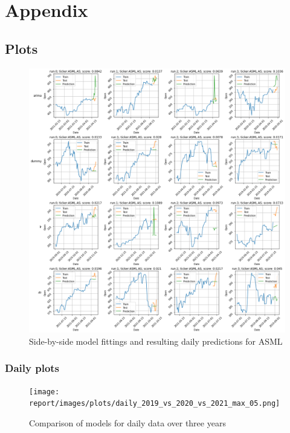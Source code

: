 \clearpage

\appendix

\section{Appendix}

\subsection{Plots}

\begin{figure}[H]
  \includegraphics[width=\textwidth]{images/plots/sample_fits_asml.png}
  \caption{Side-by-side model fittings and resulting daily predictions for ASML}
  \label{fig:samplefits}
\end{figure}

\pagebreak

\subsubsection{Daily plots}

\begin{figure}[H]
    \texttt{[image: report/images/plots/daily\_2019\_vs\_2020\_vs\_2021\_max\_05.png]}
    \caption{Comparison of models for daily data over three years}
\end{figure}

